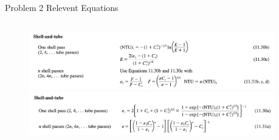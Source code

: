 \documentclass[9pt, aspectratio=169, handout]{beamer}
\begin{document}
\begin{frame}{Problem 2 Relevent Equations}
\begin{columns}
        \begin{column}{0.75\textwidth}
            \begin{figure}
                \begin{center}
                    \includegraphics[width=0.95\textwidth]{Figures/fig7.2.png}
                    \includegraphics[width=0.95\textwidth]{Figures/fig7.3.png}
                \end{center}
            \end{figure}
        \end{column}
    \end{columns}
\end{frame}
\end{document}
